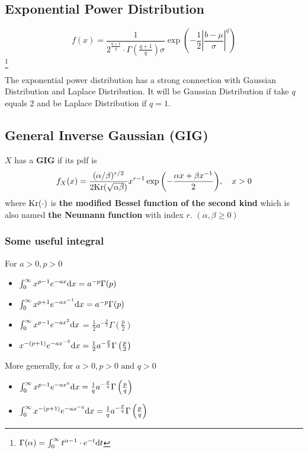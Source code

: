  	\subsection{Exponential Power Distribution}
 	$$f(x)=\frac{1}{2^{\frac{q+1}{q}}\cdot\Gamma(\frac{q+1}{q})\sigma}\exp\left(-\frac{1}{2}\left|\frac{b-\mu}{\sigma}\right|^q\right)$$\footnote{$\Gamma(\alpha) = \int_{0}^{\infty}t^{\alpha-1}\cdot e^{-t}\mathrm{d} t$}
 	
 	The exponential power distribution has a strong connection with Gaussian Distribution and Laplace Distribution. It will be Gaussian Distribution if take $q$ equals $2$ and be Laplace Distribution if $q=1$.
 	
 	
 	\subsection{General Inverse Gaussian (GIG)}
 	$X$ has a \textbf{GIG} if its pdf is
 	$$f_X(x)=\frac{(\alpha/\beta)^{r/2}}{2\mathrm{Kr}(\sqrt{\alpha\beta})}x^{r-1}\exp{\left(-\frac{\alpha x + \beta x^{-1}}{2}\right)}, \quad x>0$$ 
 	where $\mathrm{Kr}(\cdot)$ is \textbf{the modified Bessel function of the second kind} which is also named \textbf{the Neumann function} with index $r$. $(\alpha, \beta\geq0)$
 	
 	
	 	\subsubsection{Some useful integral}
	 	For $a>0,p>0$
	 	\begin{itemize}
	 		\item $\int_{0}^{\infty}x^{p-1}e^{-ax}\mathrm{d} x = a^{-p}\Gamma(p)$
	 		\item $\int_{0}^{\infty}x^{p+1}e^{-ax^{-1}}\mathrm{d} x = a^{-p}\Gamma(p)$
	 		\item $\int_{0}^{\infty}x^{p-1}e^{-ax^2}\mathrm{d} x$ = $\frac{1}{2} a^{-\frac{p}{2}}\Gamma\left(\frac{p}{2}\right)$
	 		\item $x^{-(p+1)}e^{-ax^{-2}}\mathrm{d} x = \frac{1}{2}a^{-\frac{p}{2}}\Gamma\left(\frac{p}{2}\right)$
	 	\end{itemize}
	 	
	 	More generally, for $a>0,p>0\text{ and }q>0$
	 	\begin{itemize}
	 		\item $\int_{0}^{\infty}x^{p-1}e^{-ax^q}\mathrm{d} x = \frac{1}{q}a^{-\frac{p}{q}}\Gamma\left(\frac{p}{q}\right)$
	 		\item $\int_{0}^{\infty}x^{-(p+1)}e^{-ax^{-q}}\mathrm{d} x = \frac{1}{q}a^{-\frac{p}{q}}\Gamma\left(\frac{p}{q}\right)$
	 	\end{itemize}
		
